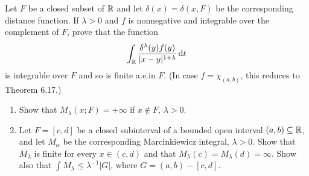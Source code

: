 \begin{problem}
  Let $F$ be a closed subset of $\mathbb{R}$ and let $\delta(x)=\delta(x,F)$ be
  the corresponding distance function. If $\lambda>0$ and $f$ is
  nonnegative and integrable over the complement of $F$, prove that the
  function
  \[
    \int_{\mathbb{R}}\frac{\delta^\lambda(y)f(y)}{|x-y|^{1+\lambda}}\mathop{}\!\mathrm{d} t
  \]
  is integrable over $F$ and so is finite a.e.\@ in $F$. (In case
  $f=\chi_{(a,b)}$, this reduces to Theorem 6.17.)
\end{problem}
\begin{solution}
\end{solution}

\begin{problem}
  \hfill
  \begin{enumerate}[label=(\alph*)]
  \item Show that $M_\lambda(x;F)=+\infty$ if $x\notin F$, $\lambda>0$.
  \item Let $F=[c,d]$ be a closed subinterval of a bounded open interval
    $(a,b)\subseteq\mathbb{R}$, and let $M_\alpha$ be the corresponding
    Marcinkiewicz integral, $\lambda>0$. Show that $M_\lambda$ is finite
    for every $x\in(c,d)$ and that $M_\lambda(c)=M_\lambda(d)=\infty$. Show
    also that $\int M_\lambda\leq\lambda^{-1}|G|$, where $G=(a,b)-[c,d]$.
  \end{enumerate}
\end{problem}
\begin{solution}
\end{solution}

